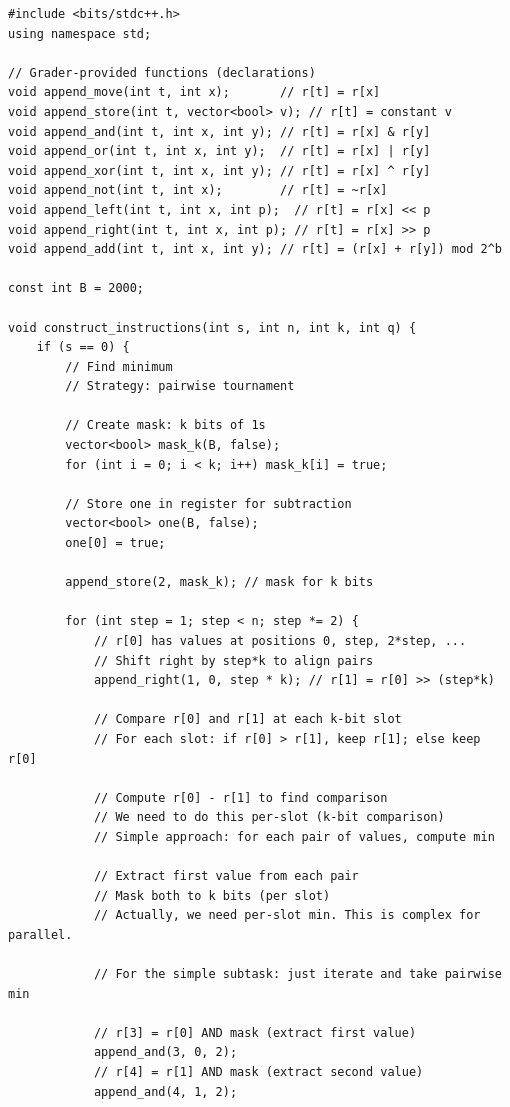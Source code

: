 \documentclass[11pt,a4paper]{article}
\begin{document}
\begin{lstlisting}
#include <bits/stdc++.h>
using namespace std;

// Grader-provided functions (declarations)
void append_move(int t, int x);       // r[t] = r[x]
void append_store(int t, vector<bool> v); // r[t] = constant v
void append_and(int t, int x, int y); // r[t] = r[x] & r[y]
void append_or(int t, int x, int y);  // r[t] = r[x] | r[y]
void append_xor(int t, int x, int y); // r[t] = r[x] ^ r[y]
void append_not(int t, int x);        // r[t] = ~r[x]
void append_left(int t, int x, int p);  // r[t] = r[x] << p
void append_right(int t, int x, int p); // r[t] = r[x] >> p
void append_add(int t, int x, int y); // r[t] = (r[x] + r[y]) mod 2^b

const int B = 2000;

void construct_instructions(int s, int n, int k, int q) {
    if (s == 0) {
        // Find minimum
        // Strategy: pairwise tournament

        // Create mask: k bits of 1s
        vector<bool> mask_k(B, false);
        for (int i = 0; i < k; i++) mask_k[i] = true;

        // Store one in register for subtraction
        vector<bool> one(B, false);
        one[0] = true;

        append_store(2, mask_k); // mask for k bits

        for (int step = 1; step < n; step *= 2) {
            // r[0] has values at positions 0, step, 2*step, ...
            // Shift right by step*k to align pairs
            append_right(1, 0, step * k); // r[1] = r[0] >> (step*k)

            // Compare r[0] and r[1] at each k-bit slot
            // For each slot: if r[0] > r[1], keep r[1]; else keep r[0]

            // Compute r[0] - r[1] to find comparison
            // We need to do this per-slot (k-bit comparison)
            // Simple approach: for each pair of values, compute min

            // Extract first value from each pair
            // Mask both to k bits (per slot)
            // Actually, we need per-slot min. This is complex for parallel.

            // For the simple subtask: just iterate and take pairwise min

            // r[3] = r[0] AND mask (extract first value)
            append_and(3, 0, 2);
            // r[4] = r[1] AND mask (extract second value)
            append_and(4, 1, 2);


\end{lstlisting}
\end{document}
